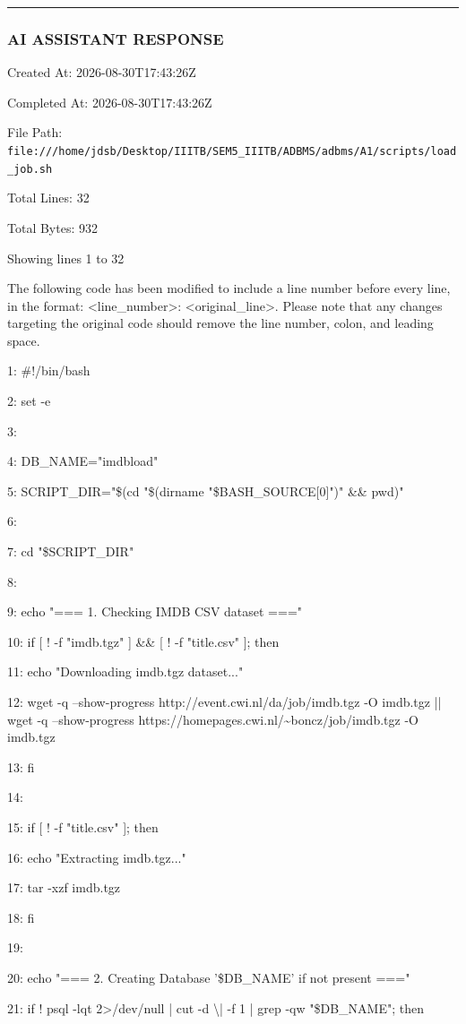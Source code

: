 \documentclass[11pt,a4paper]{article}
\begin{document}
{\hrule

\subsubsection{AI ASSISTANT RESPONSE}

Created At: 2026-08-30T17:43:26Z

Completed At: 2026-08-30T17:43:26Z

File Path: \texttt{file:///home/jdsb/Desktop/IIITB/SEM5\_IIITB/ADBMS/adbms/A1/scripts/load\_job.sh}

Total Lines: 32

Total Bytes: 932

Showing lines 1 to 32

The following code has been modified to include a line number before every line, in the format: <line\_number>: <original\_line>. Please note that any changes targeting the original code should remove the line number, colon, and leading space.

1: \#!/bin/bash

2: set -e

3:

4: DB\_NAME="imdbload"

5: SCRIPT\_DIR="\$(cd "\$(dirname "\${BASH\_SOURCE[0]}")" \&\& pwd)"

6:

7: cd "\$SCRIPT\_DIR"

8:

9: echo "=== 1. Checking IMDB CSV dataset ==="

10: if [ ! -f "imdb.tgz" ] \&\& [ ! -f "title.csv" ]; then

11:     echo "Downloading imdb.tgz dataset..."

12:     wget -q --show-progress http://event.cwi.nl/da/job/imdb.tgz -O imdb.tgz || wget -q --show-progress https://homepages.cwi.nl/\textasciitilde{}boncz/job/imdb.tgz -O imdb.tgz

13: fi

14:

15: if [ ! -f "title.csv" ]; then

16:     echo "Extracting imdb.tgz..."

17:     tar -xzf imdb.tgz

18: fi

19:

20: echo "=== 2. Creating Database '\$DB\_NAME' if not present ==="

21: if ! psql -lqt 2>/dev/null | cut -d \textbackslash{}| -f 1 | grep -qw "\$DB\_NAME"; then

}
\end{document}

